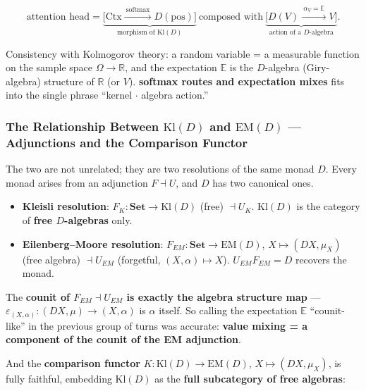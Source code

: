 \documentclass[a4paper,11pt]{article}
\begin{document}
\[\text{attention head}=\underbrace{\big[\mathrm{Ctx}\xrightarrow{\ \text{softmax}\ }D(\text{pos})\big]}_{\text{morphism of }\mathrm{Kl}(D)}\ \text{composed with}\ \underbrace{\big[D(V)\xrightarrow{\ \alpha_V=\mathbb E\ }V\big]}_{\text{action of a }D\text{-algebra}}.\]

Consistency with Kolmogorov theory: a random variable = a measurable function on the sample space \(\Omega\to\mathbb R\), and the expectation \(\mathbb E\) is the \(D\)-algebra (Giry-algebra) structure of \(\mathbb R\) (or \(V\)). \textbf{softmax routes and expectation mixes}
fits into the single phrase ``kernel $\cdot$ algebra action.''

\hypertarget{the-relationship-between-mathrmkld-and-mathrmemd-adjunctions-and-the-comparison-functor}{%
\subsubsection{\texorpdfstring{The Relationship Between \(\mathrm{Kl}(D)\) and \(\mathrm{EM}(D)\) --- Adjunctions and the Comparison Functor}{The Relationship Between \textbackslash mathrm\{Kl\}(D) and \textbackslash mathrm\{EM\}(D) --- Adjunctions and the Comparison Functor}}\label{the-relationship-between-mathrmkld-and-mathrmemd-adjunctions-and-the-comparison-functor}}

The two are not unrelated; they are two resolutions of the same monad \(D\). Every monad arises from an adjunction \(F\dashv U\), and \(D\) has two canonical ones.

\begin{itemize}
\item
  \textbf{Kleisli resolution}: \(F_K:\mathbf{Set}\to\mathrm{Kl}(D)\)
  (free) \(\dashv U_K\). \(\mathrm{Kl}(D)\) is the category of
  \textbf{free \(D\)-algebras} only.
\item
  \textbf{Eilenberg--Moore resolution}:
  \(F_{EM}:\mathbf{Set}\to\mathrm{EM}(D)\), \(X\mapsto(DX,\mu_X)\) (free
  algebra) \(\dashv U_{EM}\) (forgetful, \((X,\alpha)\mapsto X\)).
  \(U_{EM}F_{EM}=D\) recovers the monad.
\end{itemize}

The \textbf{counit of \(F_{EM}\dashv U_{EM}\) is exactly the algebra
structure map} --- \(\varepsilon_{(X,\alpha)}:(DX,\mu)\to(X,\alpha)\) is
\(\alpha\) itself. So calling the expectation \(\mathbb E\)
``counit-like'' in the previous group of turns was accurate:
\textbf{value mixing = a component of the counit of the EM adjunction}.

And the \textbf{comparison functor}
\(K:\mathrm{Kl}(D)\to\mathrm{EM}(D)\), \(X\mapsto(DX,\mu_X)\), is fully
faithful, embedding \(\mathrm{Kl}(D)\) as the \textbf{full subcategory
of free algebras}:
\end{document}
